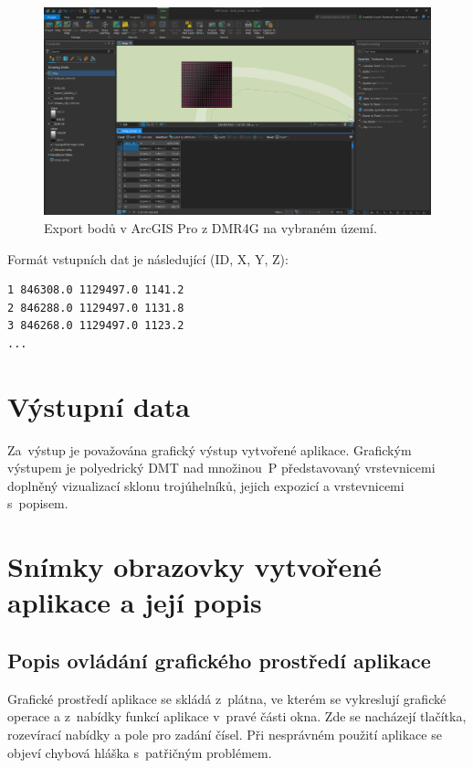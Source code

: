 \documentclass[a4paper, 12pt, oneside, titlepage]{article} %
\begin{document}
\begin{figure}[!htb]
	\centering
	\includegraphics[scale=0.33]{obrazky/arcgis_body.png} 
	\caption{Export bodů v ArcGIS Pro z DMR4G na vybraném území.
	}
	\label{fig:arcgis_body}
\end{figure} 
\FloatBarrier

Formát vstupních dat je následující (ID, X, Y, Z):
\begin{verbatim}
1 846308.0 1129497.0 1141.2
2 846288.0 1129497.0 1131.8
3 846268.0 1129497.0 1123.2
...
\end{verbatim}


\section{Výstupní data}
Za~výstup je považována grafický výstup vytvořené aplikace. Grafickým výstupem je polyedrický DMT nad množinou~P představovaný vrstevnicemi doplněný vizualizací sklonu trojúhelníků, jejich expozicí a vrstevnicemi s~popisem. 


\section{Snímky obrazovky vytvořené aplikace a její popis}\label{snimky}
\subsection{Popis ovládání grafického prostředí aplikace}
Grafické prostředí aplikace se skládá z~plátna, ve kterém se vykreslují grafické operace a z~nabídky funkcí aplikace v~pravé části okna. Zde se nacházejí tlačítka, rozevírací nabídky a pole pro zadání čísel. Při nesprávném použití aplikace se objeví chybová hláška s~patřičným problémem.
\end{document}
